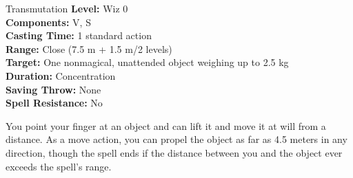 {Transmutation}
{
	\textbf{Level:}
	Wiz 0\\
	\textbf{Components:}
	V, S\\
	\textbf{Casting Time:}
	1 standard action\\
	\textbf{Range:}
	Close (7.5 m + 1.5 m/2 levels)\\
	\textbf{Target:}
	One nonmagical, unattended object weighing up to 2.5 kg\\
	\textbf{Duration:}
	Concentration\\
	\textbf{Saving Throw:}
	None\\
	\textbf{Spell Resistance:}
	No\\
}
{
	You point your finger at an object and can lift it and move it at will from a distance. As a move action, you can propel the object as far as 4.5 meters in any direction, though the spell ends if the distance between you and the object ever exceeds the spell's range.

}
